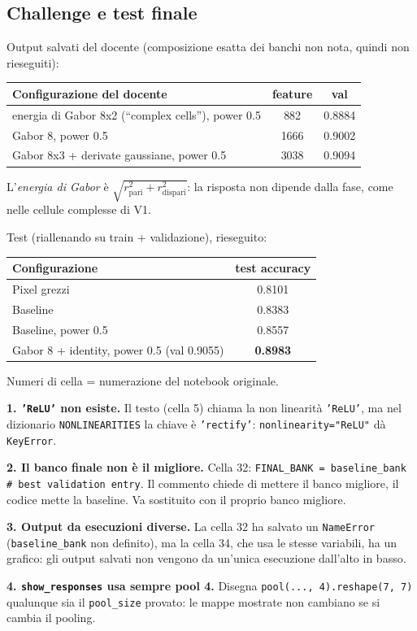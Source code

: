 \documentclass[11pt,a4paper]{article}
\newcommand{\code}[1]{\texttt{#1}}
\begin{document}
\subsection{Challenge e test finale}

Output salvati del docente (composizione esatta dei banchi non nota, quindi non rieseguiti):
\begin{center}
\begin{tabular}{@{}lcc@{}}
\toprule
Configurazione del docente & feature & val \\
\midrule
energia di Gabor 8x2 (``complex cells''), power 0.5 & 882 & 0.8884 \\
Gabor 8, power 0.5 & 1666 & 0.9002 \\
Gabor 8x3 + derivate gaussiane, power 0.5 & 3038 & 0.9094 \\
\bottomrule
\end{tabular}
\end{center}
L'\emph{energia di Gabor} è $\sqrt{r_{\text{pari}}^2 + r_{\text{dispari}}^2}$: la risposta non dipende dalla fase, come nelle cellule complesse di V1.

Test (riallenando su train + validazione), rieseguito:
\begin{center}
\begin{tabular}{@{}lc@{}}
\toprule
Configurazione & test accuracy \\
\midrule
Pixel grezzi & 0.8101 \\
Baseline & 0.8383 \\
Baseline, power 0.5 & 0.8557 \\
Gabor 8 + identity, power 0.5 (val 0.9055) & \textbf{0.8983} \\
\bottomrule
\end{tabular}
\end{center}

\begin{attenzione}
{\small Numeri di cella = numerazione del notebook originale.}

\textbf{1. \code{'ReLU'} non esiste.} Il testo (cella 5) chiama la non linearità \code{'ReLU'}, ma nel dizionario \code{NONLINEARITIES} la chiave è \code{'rectify'}: \code{nonlinearity="ReLU"} dà \code{KeyError}.

\textbf{2. Il banco finale non è il migliore.} Cella 32: \code{FINAL\_BANK = baseline\_bank \# best validation entry}. Il commento chiede di mettere il banco migliore, il codice mette la baseline. Va sostituito con il proprio banco migliore.

\textbf{3. Output da esecuzioni diverse.} La cella 32 ha salvato un \code{NameError} (\code{baseline\_bank} non definito), ma la cella 34, che usa le stesse variabili, ha un grafico: gli output salvati non vengono da un'unica esecuzione dall'alto in basso.

\textbf{4. \code{show\_responses} usa sempre pool 4.} Disegna \code{pool(..., 4).reshape(7, 7)} qualunque sia il \code{pool\_size} provato: le mappe mostrate non cambiano se si cambia il pooling.
\end{attenzione}
\end{document}
